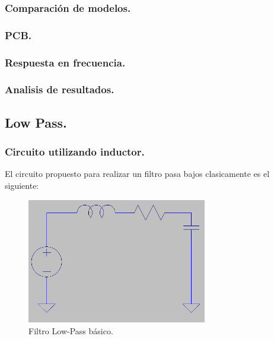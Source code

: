 \documentclass[a4paper]{article}
\begin{document}
\subsubsection{Comparación de modelos.}
\subsubsection{PCB.}
\subsubsection{Respuesta en frecuencia.}
\subsubsection{Analisis de resultados.}

\newpage
\subsection{Low Pass.}
\subsubsection{Circuito utilizando inductor.}
El circuito propuesto para realizar un filtro pasa bajos clasicamente es el siguiente:
\begin{figure}[H]	
	\centering
	\includegraphics[width=0.7\textwidth]{basicLP.PNG}
	\caption{Filtro Low-Pass básico.}
	\label{fig:basLP}
\end{figure}
\end{document}
